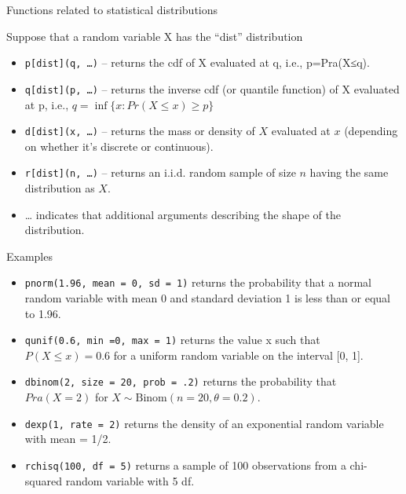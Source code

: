 \begin{frame}[fragile]{Functions related to statistical distributions}
\protect\hypertarget{functions-related-to-statistical-distributions}{}

Suppose that a random variable X has the ``dist'' distribution

\begin{itemize}
\tightlist
\item
  \texttt{p{[}dist{]}(q,\ \ldots{})} -- returns the cdf of X evaluated
  at q, i.e., p=Pra(X≤q).
\item
  \texttt{q{[}dist{]}(p,\ \ldots{})} -- returns the inverse cdf (or
  quantile function) of X evaluated at p, i.e.,
  \(q = \inf \{x:Pr(X\leq x)\geq p\}\)
\item
  \texttt{d{[}dist{]}(x,\ \ldots{})} -- returns the mass or density of
  \(X\) evaluated at \(x\) (depending on whether it's discrete or
  continuous).
\item
  \texttt{r{[}dist{]}(n,\ \ldots{})} -- returns an i.i.d. random sample
  of size \(n\) having the same distribution as \(X\).
\item
  \ldots{} indicates that additional arguments describing the shape of
  the distribution.
\end{itemize}

\end{frame}

\begin{frame}[fragile]{Examples}
\protect\hypertarget{examples}{}

\begin{itemize}
\item
  \texttt{pnorm(1.96,\ mean\ =\ 0,\ sd\ =\ 1)} returns the probability
  that a normal random variable with mean 0 and standard deviation 1 is
  less than or equal to 1.96.
\item
  \texttt{qunif(0.6,\ min\ =0,\ max\ =\ 1)} returns the value x such
  that \(P(X\leq x)=0.6\) for a uniform random variable on the interval
  {[}0, 1{]}.
\item
  \texttt{dbinom(2,\ size\ =\ 20,\ prob\ =\ .2)} returns the probability
  that \(Pra(X=2)\) for \(X\sim \text{Binom}(n=20,\theta=0.2)\).
\item
  \texttt{dexp(1,\ rate\ =\ 2)} returns the density of an exponential
  random variable with mean = 1/2.
\item
  \texttt{rchisq(100,\ df\ =\ 5)} returns a sample of 100 observations
  from a chi-squared random variable with 5 df.
\end{itemize}

\end{frame}

